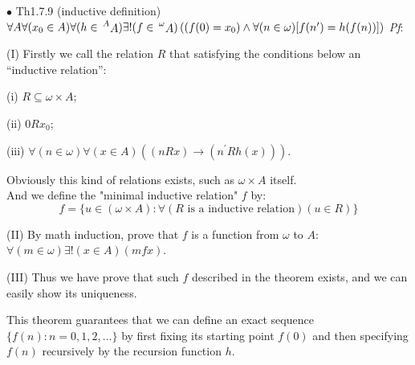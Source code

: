 \documentclass{article}
\begin{document}
\begin{Th}{$\bullet$ Th1.7.9 (inductive definition)}
    \textcolor{Th}{$\forall A\forall (x_0\in A)\forall (h\in\sideset{^A}{} {\mathop{A}})\exists!(f\in \sideset{^\omega}{} {\mathop{A}})\left((f(0) = x_0)\land \forall (n\in \omega)[f(n^\prime) = h(f(n))]\right)$}
    \tcblower
    \textit{Pf}: \begin{compactenum}
        \item[(I)] Firstly we call the relation $R$ that satisfying the conditions below an ``inductive relation'': \begin{compactenum}
            \item[(i)] $R\subseteq \omega\times A$;
            \item[(ii)] $0Rx_0$;
            \item[(iii)] $\forall (n\in \omega) \forall (x\in A) \left((nRx)\rightarrow (n^\prime R h(x))\right)$.
        \end{compactenum}
        Obviously this kind of relations exists, such as $\omega\times A$ itself.\\
        And we define the "minimal inductive relation" $f$ by:
        $$f = \{u\in (\omega\times A): \forall (R\text{ is a inductive relation})(u\in R)\}$$
        \item[(II)] By math induction, prove that $f$ is a function from $\omega$ to $A$: $\forall (m\in \omega)\exists!(x\in A)(mfx)$.
        \item[(III)] Thus we have prove that such $f$ described in the theorem exists, and we can easily show its uniqueness. 
    \end{compactenum}
\end{Th}
This theorem guarantees that we can define an exact sequence $\{f(n):n=0,1,2,\dots\}$ by first fixing its starting point $f(0)$ and then specifying $f(n)$ recursively by the recursion function $h$.
\end{document}
